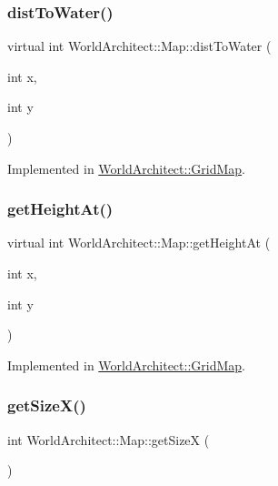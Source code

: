 \subsubsection{\texorpdfstring{distToWater()}{distToWater()}}
{\footnotesize\ttfamily virtual int World\+Architect\+::\+Map\+::dist\+To\+Water (\begin{DoxyParamCaption}\item[{int}]{x,  }\item[{int}]{y }\end{DoxyParamCaption})\hspace{0.3cm}{\ttfamily [pure virtual]}}



Implemented in \mbox{\hyperlink{class_world_architect_1_1_grid_map_ace26eee126a54bab32beee43a8adb560}{World\+Architect\+::\+Grid\+Map}}.

\mbox{\label{class_world_architect_1_1_map_ac2f33a10a0d3136515552c171d138ef2}} 
\subsubsection{\texorpdfstring{getHeightAt()}{getHeightAt()}}
{\footnotesize\ttfamily virtual int World\+Architect\+::\+Map\+::get\+Height\+At (\begin{DoxyParamCaption}\item[{int}]{x,  }\item[{int}]{y }\end{DoxyParamCaption})\hspace{0.3cm}{\ttfamily [pure virtual]}}



Implemented in \mbox{\hyperlink{class_world_architect_1_1_grid_map_a00b9a9b88ebb3272a1cd2438d1c558ab}{World\+Architect\+::\+Grid\+Map}}.

\mbox{\label{class_world_architect_1_1_map_a6742f753cca8c5bbc84e81187723b753}} 
\subsubsection{\texorpdfstring{getSizeX()}{getSizeX()}}
{\footnotesize\ttfamily int World\+Architect\+::\+Map\+::get\+SizeX (\begin{DoxyParamCaption}{ }\end{DoxyParamCaption})\hspace{0.3cm}{\ttfamily [inline]}}



